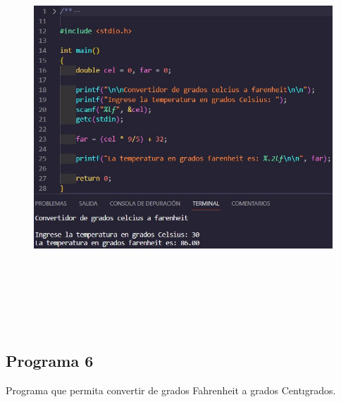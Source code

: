 \documentclass{article}
\begin{document}
\begin{figure}[H]
    \centering
    \includegraphics[height = 15cm]{img5.jpg}
\end{figure}

\newpage

\subsection{Programa 6}

Programa que permita convertir de grados Fahrenheit a grados Centıgrados.
\end{document}
